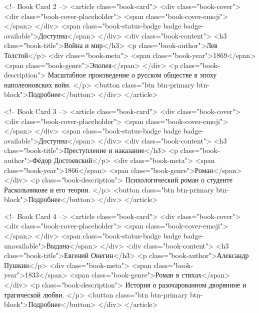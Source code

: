           <!-- Book Card 2 -->
          <article class="book-card">
            <div class="book-cover">
              <div class="book-cover-placeholder">
                <span class="book-cover-emoji">📖</span>
              </div>
              <span class="book-status-badge badge badge-available">Доступна</span>
            </div>
            <div class="book-content">
              <h3 class="book-title">Война и мир</h3>
              <p class="book-author">Лев Толстой</p>
              <div class="book-meta">
                <span class="book-year">1869</span>
                <span class="book-genre">Эпопея</span>
              </div>
              <p class="book-description">
                Масштабное произведение о русском обществе в эпоху наполеоновских войн.
              </p>
              <button class="btn btn-primary btn-block">Подробнее</button>
            </div>
          </article>

          <!-- Book Card 3 -->
          <article class="book-card">
            <div class="book-cover">
              <div class="book-cover-placeholder">
                <span class="book-cover-emoji">📖</span>
              </div>
              <span class="book-status-badge badge badge-available">Доступна</span>
            </div>
            <div class="book-content">
              <h3 class="book-title">Преступление и наказание</h3>
              <p class="book-author">Фёдор Достоевский</p>
              <div class="book-meta">
                <span class="book-year">1866</span>
                <span class="book-genre">Роман</span>
              </div>
              <p class="book-description">
                Психологический роман о студенте Раскольникове и его теории.
              </p>
              <button class="btn btn-primary btn-block">Подробнее</button>
            </div>
          </article>

          <!-- Book Card 4 -->
          <article class="book-card">
            <div class="book-cover">
              <div class="book-cover-placeholder">
                <span class="book-cover-emoji">📖</span>
              </div>
              <span class="book-status-badge badge badge-unavailable">Выдана</span>
            </div>
            <div class="book-content">
              <h3 class="book-title">Евгений Онегин</h3>
              <p class="book-author">Александр Пушкин</p>
              <div class="book-meta">
                <span class="book-year">1833</span>
                <span class="book-genre">Роман в стихах</span>
              </div>
              <p class="book-description">
                История о разочарованном дворянине и трагической любви.
              </p>
              <button class="btn btn-primary btn-block">Подробнее</button>
            </div>
          </article>


